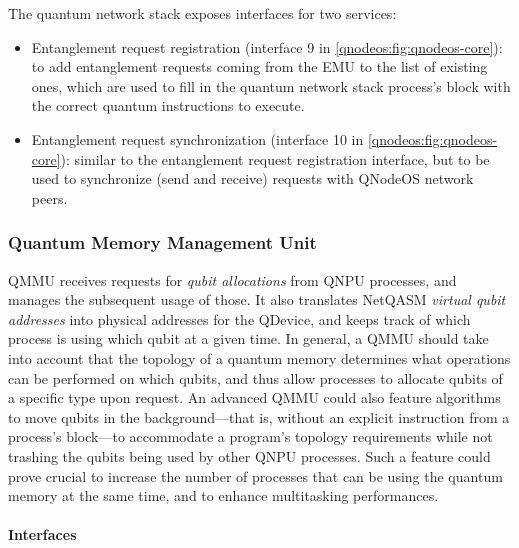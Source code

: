 The quantum network stack exposes interfaces for two services:
%
\begin{itemize}
\item Entanglement request registration (interface 9 in \cref{qnodeos:fig:qnodeos-core}): to add entanglement requests coming from the \ac{EMU} to the list of existing ones, which are used to fill in the quantum network stack process's block with the correct quantum instructions to execute.
\item Entanglement request synchronization (interface 10 in \cref{qnodeos:fig:qnodeos-core}): similar to the entanglement request registration interface, but to be used to synchronize (send and receive) requests with \ac{QNodeOS} network peers.
\end{itemize}

\subsubsection{Quantum Memory Management Unit}

\acf{QMMU} receives requests for \emph{qubit allocations} from \ac{QNPU} processes, and manages the subsequent usage of those. It also translates \ac{NetQASM} \emph{virtual qubit addresses} into physical addresses for the \ac{QDevice}, and keeps track of which process is using which qubit at a given time. In general, a \ac{QMMU} should take into account that the topology of a quantum memory determines what operations can be performed on which qubits, and thus allow processes to allocate qubits of a specific type upon request. An advanced \ac{QMMU} could also feature algorithms to move qubits in the background---that is, without an explicit instruction from a process's block---to accommodate a program's topology requirements while not trashing the qubits being used by other \ac{QNPU} processes. Such a feature could prove crucial to increase the number of processes that can be using the quantum memory at the same time, and to enhance multitasking performances.

\paragraph{Interfaces}

